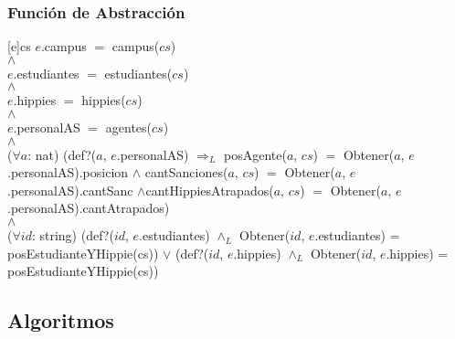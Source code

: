 \subsubsection{Función de Abstracción}
[e]{cs}{
$e$.campus $=$ campus($cs$)
\\
$\land$
\\
$e$.estudiantes $=$ estudiantes($cs$)
\\
$\land$
\\
$e$.hippies $=$ hippies($cs$)
\\
$\land$
\\
$e$.personalAS $=$ agentes($cs$)
\\
$\land$
\\
($\forall a$: nat) (def?($a$, $e$.personalAS) $\Rightarrow_L$ posAgente($a$, $cs$) $=$ Obtener($a$, $e$.personalAS).posicion $\land$ cantSanciones($a$, $cs$) $=$ Obtener($a$, $e$.personalAS).cantSanc $\land$cantHippiesAtrapados($a$, $cs$) $=$ Obtener($a$, $e$.personalAS).cantAtrapados)
\\
$\land$
\\
($\forall id$: string) (def?($id$, $e$.estudiantes) $\land_L$ Obtener($id$, $e$.estudiantes) = posEstudianteYHippie(cs)) $\lor$ (def?($id$, $e$.hippies) $\land_L$ Obtener($id$, $e$.hippies) = posEstudianteYHippie(cs))
}

\pagebreak

\subsection{Algoritmos}

\lstset{style=alg}

